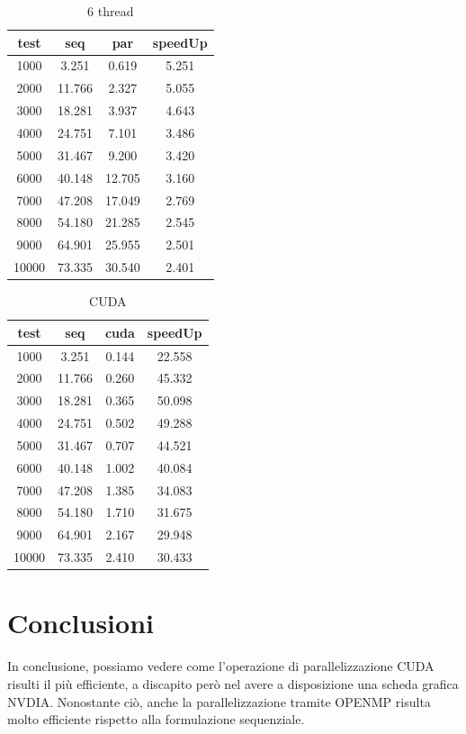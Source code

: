 \documentclass[11pt]{article}
\begin{document}
    \begin{table}
        \begin{tabular}{|c|c|c|c|}
            \hline
            test & seq & par & speedUp\\
            \hline
            1000 & 3.251 & 0.619 & 5.251 \\
            2000 & 11.766 & 2.327 & 5.055 \\
            3000 & 18.281 & 3.937 & 4.643 \\
            4000 & 24.751 & 7.101 & 3.486 \\
            5000 & 31.467 & 9.200 & 3.420 \\
            6000 & 40.148 & 12.705 & 3.160 \\
            7000 & 47.208 & 17.049 & 2.769 \\
            8000 & 54.180 & 21.285 & 2.545 \\
            9000 & 64.901 & 25.955 & 2.501 \\
            10000 & 73.335 & 30.540 & 2.401 \\
            \hline
        \end{tabular}
        \caption{6 thread}
    \end{table}

    \begin{table}
        \begin{tabular}{|c|c|c|c|}
            \hline
            test & seq & cuda & speedUp\\
            \hline
            1000 & 3.251 & 0.144 & 22.558 \\
            2000 & 11.766 & 0.260 & 45.332 \\
            3000 & 18.281 & 0.365 & 50.098 \\
            4000 & 24.751 & 0.502 & 49.288 \\
            5000 & 31.467 & 0.707 & 44.521 \\
            6000 & 40.148 & 1.002 & 40.084 \\
            7000 & 47.208 & 1.385 & 34.083 \\
            8000 & 54.180 & 1.710 & 31.675 \\
            9000 & 64.901 & 2.167 & 29.948 \\
            10000 & 73.335 & 2.410 & 30.433 \\
            \hline
        \end{tabular}
        \caption{CUDA}
    \end{table}

    \clearpage

    \section{Conclusioni}\label{sec:conclusioni}
    In conclusione, possiamo vedere come l'operazione di parallelizzazione CUDA risulti il più efficiente, a
    discapito però nel avere a disposizione una scheda grafica NVDIA\@.
    Nonostante ciò, anche la parallelizzazione tramite OPENMP risulta molto efficiente rispetto alla formulazione
    sequenziale.
\end{document}
